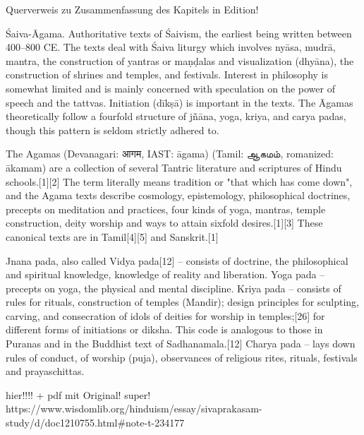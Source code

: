 Querverweis zu Zusammenfassung des Kapitels in Edition! 

Śaiva-Āgama. Authoritative texts of Śaivism, the earliest being written between 400–800 CE. The texts deal with Śaiva liturgy which involves nyāsa, mudrā, mantra, the construction of yantras or maṇḍalas and visualization (dhyāna), the construction of shrines and temples, and festivals. Interest in philosophy is somewhat limited and is mainly concerned with speculation on the power of speech and the tattvas. Initiation (dīkṣā) is important in the texts. The Āgamas theoretically follow a fourfold structure of jñāna, yoga, kriya, and carya padas, though this pattern is seldom strictly adhered to.


The Agamas (Devanagari: आगम, IAST: āgama) (Tamil: ஆகமம், romanized: ākamam) are a collection of several Tantric literature and scriptures of Hindu schools.[1][2] The term literally means tradition or "that which has come down", and the Agama texts describe cosmology, epistemology, philosophical doctrines, precepts on meditation and practices, four kinds of yoga, mantras, temple construction, deity worship and ways to attain sixfold desires.[1][3] These canonical texts are in Tamil[4][5] and Sanskrit.[1]

    Jnana pada, also called Vidya pada[12] – consists of doctrine, the philosophical and spiritual knowledge, knowledge of reality and liberation.
    Yoga pada – precepts on yoga, the physical and mental discipline.
    Kriya pada – consists of rules for rituals, construction of temples (Mandir); design principles for sculpting, carving, and consecration of idols of deities for worship in temples;[26] for different forms of initiations or diksha. This code is analogous to those in Puranas and in the Buddhist text of Sadhanamala.[12]
    Charya pada – lays down rules of conduct, of worship (puja), observances of religious rites, rituals, festivals and prayaschittas.


hier!!!! + pdf mit Original! super! 
https://www.wisdomlib.org/hinduism/essay/sivaprakasam-study/d/doc1210755.html#note-t-234177


